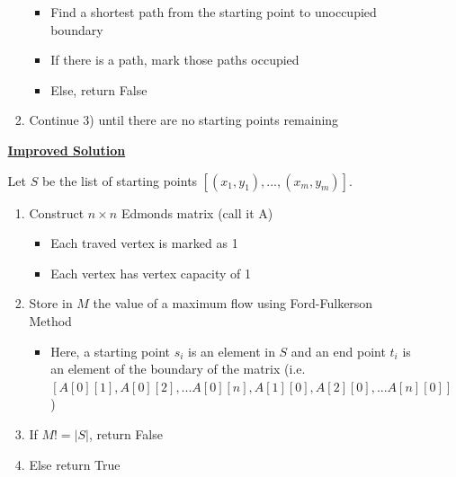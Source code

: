 \documentclass[12pt]{article}
\begin{document}
\begin{enumerate}[1.]
\begin{enumerate}[a)]
\begin{enumerate}[1)]
            \begin{itemize}
                \item Find a shortest path from the starting point to unoccupied boundary
                \item If there is a path, mark those paths occupied
                \item Else, return False
            \end{itemize}

            \item Continue 3) until there are no starting points remaining
        \end{enumerate}

        \bigskip

        \underline{\textbf{Improved Solution}}

        \bigskip

        Let $S$ be the list of starting points $[(x_1, y_1), ..., (x_m, y_m)]$.

        \bigskip

        \begin{enumerate}[1)]
            \item Construct $n \times n$ Edmonds matrix (call it A)

            \begin{itemize}
                \item Each traved vertex is marked as 1
                \item Each vertex has vertex capacity of 1
            \end{itemize}
            \item Store in $M$ the value of a maximum flow using Ford-Fulkerson Method

            \begin{itemize}
                \item Here, a starting point $s_i$ is an element in $S$ and an end point $t_i$ is an element of the boundary of the matrix
                (i.e. $[A[0][1], A[0][2], ... A[0][n], A[1][0], A[2][0], ... A[n][0]]$)
            \end{itemize}
            \item If $M != \lvert S \rvert$, return False
            \item Else return True

        \end{enumerate}

        \bigskip




\end{enumerate}
\end{enumerate}
\end{document}
